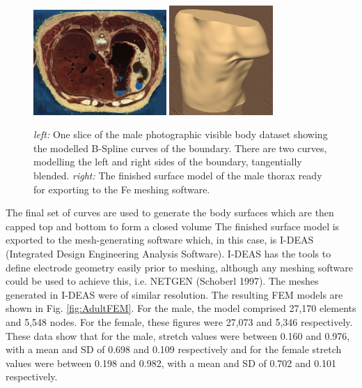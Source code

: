 \documentclass[12pt]{iopart}
\begin{document}
\begin{figure}[bhtp]
\begin{center}
  \includegraphics[width= 0.45\textwidth]
         {figures/adult-slice.jpg}
  \includegraphics[width= 0.35\textwidth]
         {figures/adult-model.jpg}

\caption{ \label{fig:Adultmodel}
{\em left:} One slice of the male photographic visible body dataset showing the modelled B-Spline curves of the boundary.  There are two curves, modelling the left and right sides of the boundary, tangentially blended.
{\em right:} The finished surface model of the male thorax ready for exporting to the Fe meshing software.
}
\end{center}
\end{figure}

The final set of curves are used to generate the body surfaces which are
then capped top and bottom to form a closed volume The finished surface
model is exported to the mesh-generating software which, in this case,
is I-DEAS (Integrated Design Engineering Analysis Software).
I-DEAS has the tools to define electrode geometry easily prior to meshing,
although any meshing software could be used to achieve this,
i.e. NETGEN (Schoberl 1997).
The meshes generated in I-DEAS were of similar resolution.  The
resulting FEM models are shown in Fig. \ref{fig:AdultFEM}.
For the male, the model comprised 27,170 elements and 5,548 nodes.
For the female, these figures were 27,073 and 5,346 respectively.
These data show that for the male, stretch values were between 0.160
and 0.976, with a mean and SD of 0.698 and 0.109 respectively and for
the female stretch values were between 0.198 and 0.982, with a mean and
SD of 0.702 and 0.101 respectively.
\end{document}
